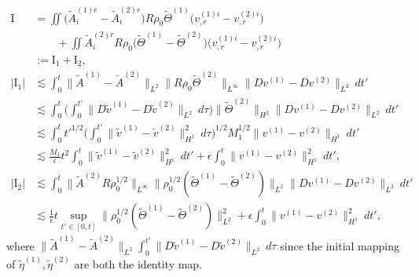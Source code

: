 \documentclass[12pt,a4paper]{amsart}
\numberwithin{equation}{section}
\theoremstyle{plain}
\theoremstyle{definition}
\begin{document}
\begin{align*}
\mathrm{I}&=\iint \Big(\widetilde{A}^{(1)r}_i -\widetilde{A}^{(2)r}_i \Big)R\rho_{0}\widetilde{\Theta}^{(1)} \Big(v^{(1)i}_{,r}-v^{(2)i}_{,r}\Big)\\
 &\qquad +\iint \widetilde{A}^{(2)r}_iR\rho_{0}\Big(\widetilde{\Theta}^{(1)}-\widetilde{\Theta}^{(2)}  \Big) \Big(v^{(1)i}_{,r}-v^{(2)i}_{,r}\Big)\\
 &:= \mathrm{I}_1+\mathrm{I}_2,\\
|\mathrm{I}_1|&\lesssim\int_{0}^{t}\|\widetilde{A}^{(1)}-\widetilde{A}^{(2)}\|_{L^2}\|R\rho_{0}\widetilde{\Theta}^{(2)}\|_{L^{\infty}}\|Dv^{(1)}-Dv^{(2)}\|_{L^2} \ dt'\\
 &\lesssim \int_{0}^{t} \Big( \int_{0}^{t'} \|D\widetilde{v}^{(1)}-D\widetilde{v}^{(2)}\|_{L^2} \ d\tau \Big) \|\widetilde{\Theta}^{(2)}\|_{H^2}\|Dv^{(1)}-Dv^{(2)}\|_{L^2}\ dt'\\
 &\lesssim \int_{0}^{t} t'^{1/2} \Big(\int_{0}^{t'} \|\widetilde{v}^{(1)}-\widetilde{v}^{(2)}\|_{H^1}^2 \ d\tau \Big)^{1/2} M_1^{1/2}\|v^{(1)}-v^{(2)}\|_{H^1}\ dt'\\
 &\lesssim \frac{M_1}{\epsilon}t^2 \int_{0}^{t} \|\widetilde{v}^{(1)}-\widetilde{v}^{(2)}\|_{H^1}^2 \ dt' +\epsilon\int_{0}^{t} \|v^{(1)}-v^{(2)}\|_{H^1}^2 \ dt',\\
|\mathrm{I}_2|&\lesssim \int_{0}^{t} \|\widetilde{A}^{(2)}R\rho_{0}^{1/2}\|_{L^{\infty}}\|\rho_{0}^{1/2}(\widetilde{\Theta}^{(1)}-\widetilde{\Theta}^{(2)})\|_{L^{2}}\|Dv^{(1)}-Dv^{(2)}\|_{L^2} \ dt'\\
 &\lesssim \frac{1}{\epsilon}t\sup\limits_{t'\in[0,t]}\|\rho_{0}^{1/2}(\widetilde{\Theta}^{(1)}-\widetilde{\Theta}^{(2)})\|_{L^{2}}^2 +\epsilon\int_{0}^{t} \|v^{(1)}-v^{(2)}\|_{H^1}^2 \ dt',%
\end{align*}
where $\|\widetilde{A}^{(1)}-\widetilde{A}^{(2)}\|_{L^2}  \int_{0}^{t'} \|D\widetilde{v}^{(1)}-D\widetilde{v}^{(2)}\|_{L^2} \ d\tau $ since the initial mapping of $\widetilde{\eta}^{(1)}, \widetilde{\eta}^{(2)}$ are both the identity map.
\end{document}
